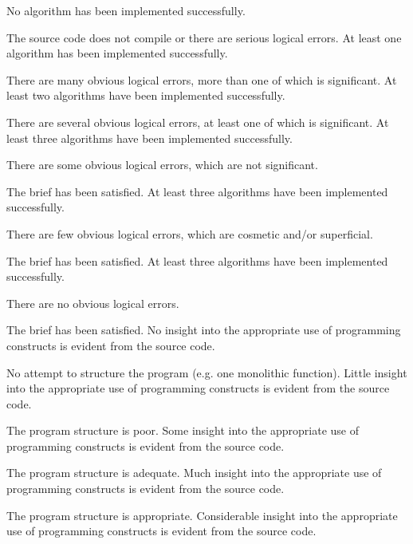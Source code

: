 \documentclass{../fal_assignment}
\begin{document}
\begin{markingrubric}
%
        \grade\fail 	No algorithm has been implemented successfully.
            \par 		The source code does not compile or there are serious logical errors.
        \grade 		At least one algorithm has been  implemented successfully.
            \par 		There are many obvious logical errors, more than one of which is significant.   
        \grade 		At least two algorithms have been  implemented successfully.
            \par 		There are several obvious logical errors, at least one of which is significant. 
        \grade 		At least three algorithms have been  implemented successfully.
            \par 		There are some obvious logical errors, which are not significant. 
            \par		The brief has been satisfied.
        \grade 		At least three algorithms have been  implemented successfully.
            \par 		There are few obvious logical errors, which are cosmetic and/or superficial.
            \par		The brief has been satisfied.     
        \grade 		At least three algorithms have been  implemented successfully.
            \par		There are no obvious logical errors.
            \par		The brief has been satisfied.
%
        \grade\fail No insight into the appropriate use of programming constructs is evident from the source code.
            \par No attempt to structure the program (e.g. one monolithic function).
        \grade Little insight into the appropriate use of programming constructs is evident from the source code.
            \par The program structure is poor.
        \grade Some insight into the appropriate use of programming constructs is evident from the source code.
            \par The program structure is adequate.
        \grade Much insight into the appropriate use of programming constructs is evident from the source code.
            \par The program structure is appropriate.
        \grade Considerable insight into the appropriate use of programming constructs is evident from the source code.

\end{markingrubric}
\end{document}

